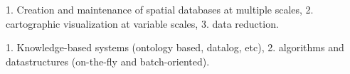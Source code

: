 \documentclass[11pt, oneside]{report}
\begin{document}


1. Creation and maintenance of spatial databases at multiple scales,
2. cartographic visualization at variable scales, 
3. data reduction.

1. Knowledge-based systems (ontology based, datalog, etc),
2. algorithms and datastructures (on-the-fly and batch-oriented).  
\end{document}
